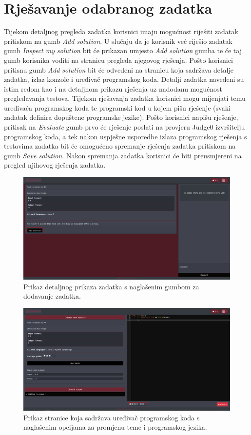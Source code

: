 \documentclass[times, utf8, zavrsni]{fer}
\begin{document}
		\section{Rješavanje odabranog zadatka}
		Tijekom detaljnog pregleda zadatka korisnici imaju mogućnost riješiti zadatak pritiskom na gumb \textit{Add solution}. U slučaju da je korisnik već riješio zadatak gumb \textit{Inspect my solution} bit će prikazan umjesto \textit{Add solution} gumba te će taj gumb korisnika voditi na stranicu pregleda njegovog rješenja. Pošto korisnici pritisnu gumb \textit{Add solution} bit će odvedeni na stranicu koja sadržava detalje zadatka, izlaz konzole i uređivač programskog koda. Detalji zadatka navedeni su istim redom kao i na detaljnom prikazu rješenja uz nadodanu mogućnost pregledavanja testova. Tijekom rješavanja zadatka korisnici mogu mijenjati temu uređivača programskog koda te programski kod u kojem pišu rješenje (svaki zadatak definira dopuštene programske jezike). Pošto korisnici napišu rješenje, pritisak na \textit{Evaluate} gumb prvo će rješenje poslati na provjeru Judge0 izvršitelju programskog koda, a tek nakon uspješne usporedbe izlaza programskog rješenja s testovima zadatka bit će omogućeno spremanje rješenja zadatka pritiskom na gumb \textit{Save solution}. Nakon spremanja zadatka korisnici će biti preusmjereni na pregled njihovog rješenja zadatka.
		\begin{figure}[htb]
			\centering
			\includegraphics[width=\linewidth]{pictures/koristenje/DodajRjesenje.png}
			\caption{Prikaz detaljnog prikaza zadatka s naglašenim gumbom za dodavanje zadatka.}
			\label{fig:dodajrjesenje}
		\end{figure}
		\begin{figure}[htb]
			\centering
			\includegraphics[width=\linewidth]{pictures/koristenje/StranicaRjesavanja.png}
			\caption{Prikaz stranice koja sadržava uređivač programskog koda s naglašenim opcijama za promjenu teme i programskog jezika.}
			\label{fig:rjesavanje}
		\end{figure}
\end{document}
